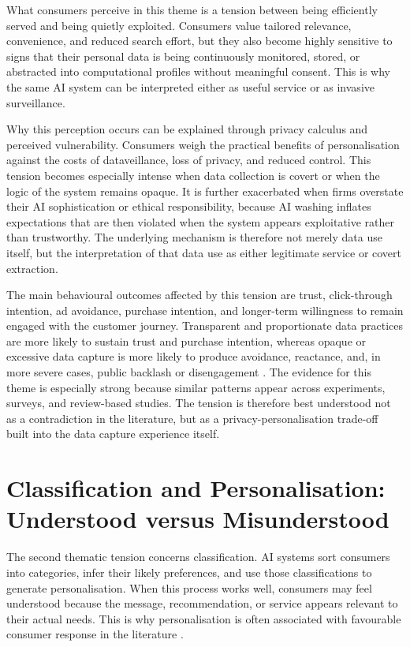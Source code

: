 What consumers perceive in this theme is a tension between being efficiently served and being quietly exploited. Consumers value tailored relevance, convenience, and reduced search effort, but they also become highly sensitive to signs that their personal data is being continuously monitored, stored, or abstracted into computational profiles without meaningful consent. This is why the same AI system can be interpreted either as useful service or as invasive surveillance.

Why this perception occurs can be explained through privacy calculus and perceived vulnerability. Consumers weigh the practical benefits of personalisation against the costs of dataveillance, loss of privacy, and reduced control. This tension becomes especially intense when data collection is covert or when the logic of the system remains opaque. It is further exacerbated when firms overstate their AI sophistication or ethical responsibility, because AI washing inflates expectations that are then violated when the system appears exploitative rather than trustworthy. The underlying mechanism is therefore not merely data use itself, but the interpretation of that data use as either legitimate service or covert extraction.

The main behavioural outcomes affected by this tension are trust, click-through intention, ad avoidance, purchase intention, and longer-term willingness to remain engaged with the customer journey. Transparent and proportionate data practices are more likely to sustain trust and purchase intention, whereas opaque or excessive data capture is more likely to produce avoidance, reactance, and, in more severe cases, public backlash or disengagement \cite{an2025personalized,srivastava2026social}. The evidence for this theme is especially strong because similar patterns appear across experiments, surveys, and review-based studies. The tension is therefore best understood not as a contradiction in the literature, but as a privacy-personalisation trade-off built into the data capture experience itself.

\section{Classification and Personalisation: Understood versus Misunderstood}
The second thematic tension concerns classification. AI systems sort consumers into categories, infer their likely preferences, and use those classifications to generate personalisation. When this process works well, consumers may feel understood because the message, recommendation, or service appears relevant to their actual needs. This is why personalisation is often associated with favourable consumer response in the literature \cite{an2025personalized,haleem2022ai,kumar2024aipowered}.

